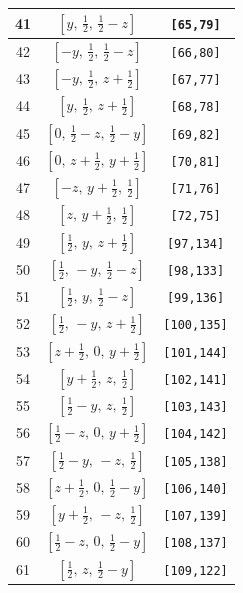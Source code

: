 \documentclass[fleqn,8pt]{jsarticle}
\begin{document}
\begin{longtable}{ccc}
41 & $\left[ y,\, \frac{1}{2},\, \frac{1}{2} - z \right]$ & {\tt [65,79]} \\ \hline
42 & $\left[ - y,\, \frac{1}{2},\, \frac{1}{2} - z \right]$ & {\tt [66,80]} \\ \hline
43 & $\left[ - y,\, \frac{1}{2},\, z + \frac{1}{2} \right]$ & {\tt [67,77]} \\ \hline
44 & $\left[ y,\, \frac{1}{2},\, z + \frac{1}{2} \right]$ & {\tt [68,78]} \\ \hline
45 & $\left[ 0,\, \frac{1}{2} - z,\, \frac{1}{2} - y \right]$ & {\tt [69,82]} \\ \hline
46 & $\left[ 0,\, z + \frac{1}{2},\, y + \frac{1}{2} \right]$ & {\tt [70,81]} \\ \hline
47 & $\left[ - z,\, y + \frac{1}{2},\, \frac{1}{2} \right]$ & {\tt [71,76]} \\ \hline
48 & $\left[ z,\, y + \frac{1}{2},\, \frac{1}{2} \right]$ & {\tt [72,75]} \\ \hline
49 & $\left[ \frac{1}{2},\, y,\, z + \frac{1}{2} \right]$ & {\tt [97,134]} \\ \hline
50 & $\left[ \frac{1}{2},\, - y,\, \frac{1}{2} - z \right]$ & {\tt [98,133]} \\ \hline
51 & $\left[ \frac{1}{2},\, y,\, \frac{1}{2} - z \right]$ & {\tt [99,136]} \\ \hline
52 & $\left[ \frac{1}{2},\, - y,\, z + \frac{1}{2} \right]$ & {\tt [100,135]} \\ \hline
53 & $\left[ z + \frac{1}{2},\, 0,\, y + \frac{1}{2} \right]$ & {\tt [101,144]} \\ \hline
54 & $\left[ y + \frac{1}{2},\, z,\, \frac{1}{2} \right]$ & {\tt [102,141]} \\ \hline
55 & $\left[ \frac{1}{2} - y,\, z,\, \frac{1}{2} \right]$ & {\tt [103,143]} \\ \hline
56 & $\left[ \frac{1}{2} - z,\, 0,\, y + \frac{1}{2} \right]$ & {\tt [104,142]} \\ \hline
57 & $\left[ \frac{1}{2} - y,\, - z,\, \frac{1}{2} \right]$ & {\tt [105,138]} \\ \hline
58 & $\left[ z + \frac{1}{2},\, 0,\, \frac{1}{2} - y \right]$ & {\tt [106,140]} \\ \hline
59 & $\left[ y + \frac{1}{2},\, - z,\, \frac{1}{2} \right]$ & {\tt [107,139]} \\ \hline
60 & $\left[ \frac{1}{2} - z,\, 0,\, \frac{1}{2} - y \right]$ & {\tt [108,137]} \\ \hline
61 & $\left[ \frac{1}{2},\, z,\, \frac{1}{2} - y \right]$ & {\tt [109,122]} \\ \hline

\end{longtable}
\end{document}
